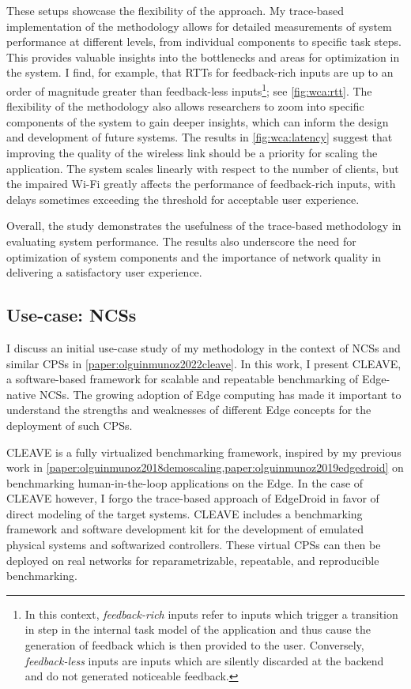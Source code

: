 These setups showcase the flexibility of the approach.
My trace-based implementation of the methodology allows for detailed measurements of system performance at different levels, from individual components to specific task steps.
This provides valuable insights into the bottlenecks and areas for optimization in the system.
I find, for example, that \glspl{RTT} for feedback-rich inputs are up to an order of magnitude greater than feedback-less inputs\footnote{%
    In this context, \emph{feedback-rich} inputs refer to inputs which trigger a transition in step in the internal task model of the application and thus cause the generation of feedback which is then provided to the user.
    Conversely, \emph{feedback-less} inputs are inputs which are silently discarded at the backend and do not generated noticeable feedback.
}; see \cref{fig:wca:rtt}.
The flexibility of the methodology also allows researchers to zoom into specific components of the system to gain deeper insights, which can inform the design and development of future systems.
The results in \cref{fig:wca:latency} suggest that improving the quality of the wireless link should be a priority for scaling the application.
The system scales linearly with respect to the number of clients, but the impaired Wi-Fi greatly affects the performance of feedback-rich inputs, with delays sometimes exceeding the threshold for acceptable user experience.

Overall, the study demonstrates the usefulness of the trace-based methodology in evaluating system performance.
The results also underscore the need for optimization of system components and the importance of network quality in delivering a satisfactory user experience.

\subsection{Use-case: \acsp{NCS}}\label{summary:methodology:usecase_ncs}

I discuss an initial use-case study of my methodology in the context of \glspl{NCS} and similar \glspl{CPS} in \cref{paper:olguinmunoz2022cleave}.
In this work, I present \gls{CLEAVE}, a software-based framework for scalable and repeatable benchmarking of Edge-native \aclp{NCS}.
The growing adoption of Edge computing has made it important to understand the strengths and weaknesses of different Edge concepts for the deployment of such \glspl{CPS}.

\gls{CLEAVE} is a fully virtualized benchmarking framework, inspired by my previous work in \cref{paper:olguinmunoz2018demoscaling,paper:olguinmunoz2019edgedroid} on benchmarking human-in-the-loop applications on the Edge.
In the case of \gls{CLEAVE} however, I forgo the trace-based approach of EdgeDroid in favor of direct modeling of the target systems.
\gls{CLEAVE} includes a benchmarking framework and software development kit for the development of emulated physical systems and softwarized controllers.
These virtual \glspl{CPS} can then be deployed on real networks for reparametrizable, repeatable, and reproducible benchmarking.

